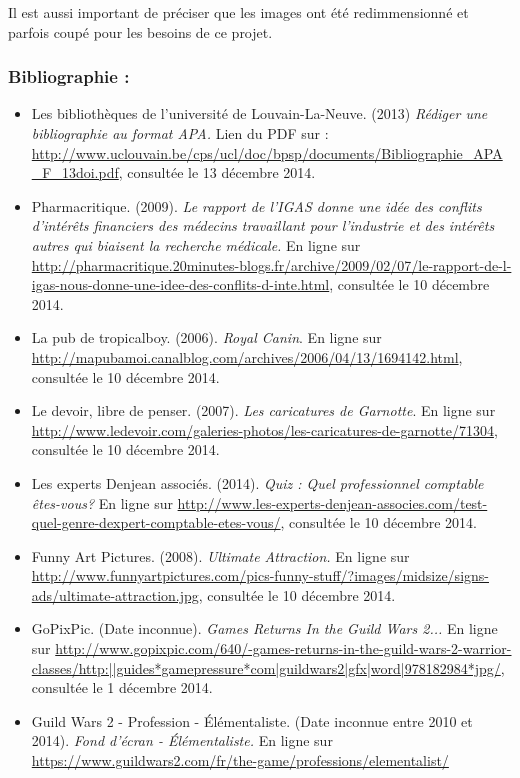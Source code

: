 \documentclass[a4paper,titlepage]{article}
\begin{document}
Il est aussi important de préciser que les images ont été redimmensionné et parfois coupé pour les besoins de ce projet.	
	
\subsubsection*{Bibliographie :}

\begin{itemize}
	\item Les bibliothèques de l'université de Louvain-La-Neuve. (2013) \textit{Rédiger une bibliographie au format APA.} Lien du PDF sur : \url{http://www.uclouvain.be/cps/ucl/doc/bpsp/documents/Bibliographie\_APA\_F\_13doi.pdf},  consultée le 13 décembre 2014.
	\item Pharmacritique. (2009). \textit{Le rapport de l'IGAS donne une idée des conflits d'intérêts financiers des médecins travaillant pour l'industrie et des intérêts autres qui biaisent la recherche médicale.} En ligne sur \url{http://pharmacritique.20minutes-blogs.fr/archive/2009/02/07/le-rapport-de-l-igas-nous-donne-une-idee-des-conflits-d-inte.html}, consultée le 10 décembre 2014.
	\item La pub de tropicalboy. (2006). \textit{Royal Canin}. En ligne sur \url{http://mapubamoi.canalblog.com/archives/2006/04/13/1694142.html}, consultée le 10 décembre 2014.
	\item Le devoir, libre de penser. (2007). \textit{Les caricatures de Garnotte}. En ligne sur \url{http://www.ledevoir.com/galeries-photos/les-caricatures-de-garnotte/71304}, consultée le 10 décembre 2014.
	\item Les experts Denjean associés. (2014). \textit{Quiz : Quel professionnel comptable êtes-vous?} En ligne sur \url{http://www.les-experts-denjean-associes.com/test-quel-genre-dexpert-comptable-etes-vous/}, consultée le 10 décembre 2014.
	\item Funny Art Pictures. (2008). \textit{Ultimate Attraction.} En ligne sur \url{http://www.funnyartpictures.com/pics-funny-stuff/?images/midsize/signs-ads/ultimate-attraction.jpg}, consultée le 10 décembre 2014.
	\item GoPixPic. (Date inconnue). \textit{Games Returns In the Guild Wars 2...} En ligne sur \url{http://www.gopixpic.com/640/-games-returns-in-the-guild-wars-2-warrior-classes/http:||guides*gamepressure*com|guildwars2|gfx|word|978182984*jpg/}, consultée le 1 décembre 2014.
	\item Guild Wars 2 - Profession - Élémentaliste. (Date inconnue entre 2010 et 2014). \textit{Fond d'écran - Élémentaliste.} En ligne sur \url{https://www.guildwars2.com/fr/the-game/professions/elementalist/}

\end{itemize}
\end{document}
